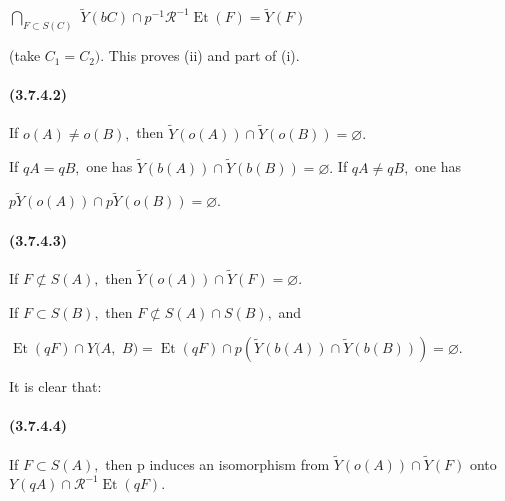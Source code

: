 \documentclass[10pt,a4paper]{article}
\begin{document}
\ensuremath{\bigcap_{F\subset{}S(C)}} \ensuremath{\widetilde{Y}(bC)\cap{}p^{-1}\mathcal{R}^{-1}\operatorname{Et}(F)=\widetilde{Y}(F)}\par

(take \ensuremath{C_1=C_2).} This proves (ii) and part of (i).\par


\paragraph{(3.7.4.2)} If \ensuremath{o(A)\ne{}o(B),} then \ensuremath{\widetilde{Y}(o(A))\cap{}\widetilde{Y}(o(B))=\varnothing{}.}

If \ensuremath{qA=qB,} one has \ensuremath{\widetilde{Y}(b(A))\cap{}\widetilde{Y}(b(B))=\varnothing{}.} If \ensuremath{qA\ne{}qB,} one has\par

\ensuremath{p\widetilde{Y}(o(A))\cap{}p\widetilde{Y}(o(B))=\varnothing{}.}\par

\paragraph{(3.7.4.3)} If \ensuremath{F\not\subset{}S(A),} then \ensuremath{\widetilde{Y}(o(A))\cap{}\widetilde{Y}(F)=\varnothing{}.}

If \ensuremath{F\subset{}S(B),} then \ensuremath{F\not\subset{}S(A)\cap{}S(B),} and\par

\ensuremath{\operatorname{Et}(qF)\cap{}Y(A,} \ensuremath{B)=\operatorname{Et}(qF)\cap{}p(\widetilde{Y}(b(A))\cap{}\widetilde{Y}(b(B)))=\varnothing{}.}\par

It is clear that:\par

\paragraph{(3.7.4.4)} If \ensuremath{F\subset{}S(A),} then p induces an isomorphism from \ensuremath{\widetilde{Y}(o(A))\cap{}\widetilde{Y}(F)} onto \ensuremath{Y(qA)\cap{}\mathcal{R}^{-1}\operatorname{Et}(qF).}
\end{document}
